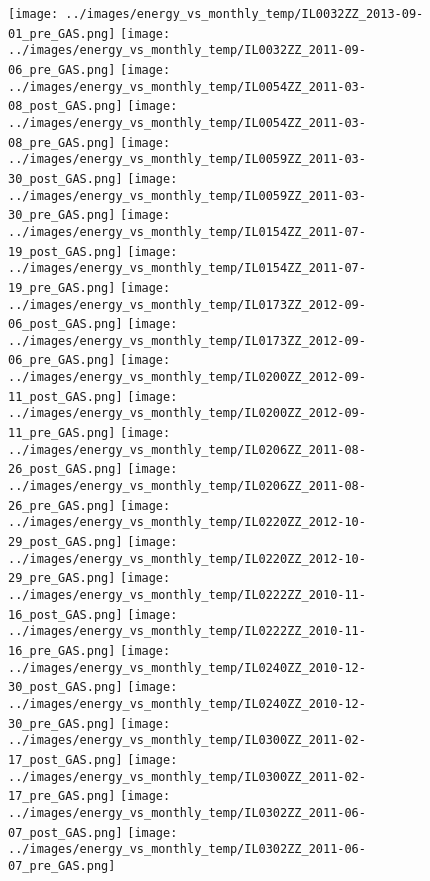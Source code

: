 \clearpage
\begin{figure}
\centering
\texttt{[image: ../images/energy\_vs\_monthly\_temp/IL0032ZZ\_2013-09-01\_pre\_GAS.png]}
\texttt{[image: ../images/energy\_vs\_monthly\_temp/IL0032ZZ\_2011-09-06\_pre\_GAS.png]}
\texttt{[image: ../images/energy\_vs\_monthly\_temp/IL0054ZZ\_2011-03-08\_post\_GAS.png]}
\texttt{[image: ../images/energy\_vs\_monthly\_temp/IL0054ZZ\_2011-03-08\_pre\_GAS.png]}
\texttt{[image: ../images/energy\_vs\_monthly\_temp/IL0059ZZ\_2011-03-30\_post\_GAS.png]}
\texttt{[image: ../images/energy\_vs\_monthly\_temp/IL0059ZZ\_2011-03-30\_pre\_GAS.png]}
\texttt{[image: ../images/energy\_vs\_monthly\_temp/IL0154ZZ\_2011-07-19\_post\_GAS.png]}
\texttt{[image: ../images/energy\_vs\_monthly\_temp/IL0154ZZ\_2011-07-19\_pre\_GAS.png]}
\texttt{[image: ../images/energy\_vs\_monthly\_temp/IL0173ZZ\_2012-09-06\_post\_GAS.png]}
\texttt{[image: ../images/energy\_vs\_monthly\_temp/IL0173ZZ\_2012-09-06\_pre\_GAS.png]}
\texttt{[image: ../images/energy\_vs\_monthly\_temp/IL0200ZZ\_2012-09-11\_post\_GAS.png]}
\texttt{[image: ../images/energy\_vs\_monthly\_temp/IL0200ZZ\_2012-09-11\_pre\_GAS.png]}
\texttt{[image: ../images/energy\_vs\_monthly\_temp/IL0206ZZ\_2011-08-26\_post\_GAS.png]}
\texttt{[image: ../images/energy\_vs\_monthly\_temp/IL0206ZZ\_2011-08-26\_pre\_GAS.png]}
\texttt{[image: ../images/energy\_vs\_monthly\_temp/IL0220ZZ\_2012-10-29\_post\_GAS.png]}
\texttt{[image: ../images/energy\_vs\_monthly\_temp/IL0220ZZ\_2012-10-29\_pre\_GAS.png]}
\texttt{[image: ../images/energy\_vs\_monthly\_temp/IL0222ZZ\_2010-11-16\_post\_GAS.png]}
\texttt{[image: ../images/energy\_vs\_monthly\_temp/IL0222ZZ\_2010-11-16\_pre\_GAS.png]}
\texttt{[image: ../images/energy\_vs\_monthly\_temp/IL0240ZZ\_2010-12-30\_post\_GAS.png]}
\texttt{[image: ../images/energy\_vs\_monthly\_temp/IL0240ZZ\_2010-12-30\_pre\_GAS.png]}
\texttt{[image: ../images/energy\_vs\_monthly\_temp/IL0300ZZ\_2011-02-17\_post\_GAS.png]}
\texttt{[image: ../images/energy\_vs\_monthly\_temp/IL0300ZZ\_2011-02-17\_pre\_GAS.png]}
\texttt{[image: ../images/energy\_vs\_monthly\_temp/IL0302ZZ\_2011-06-07\_post\_GAS.png]}
\texttt{[image: ../images/energy\_vs\_monthly\_temp/IL0302ZZ\_2011-06-07\_pre\_GAS.png]}
\end{figure}
